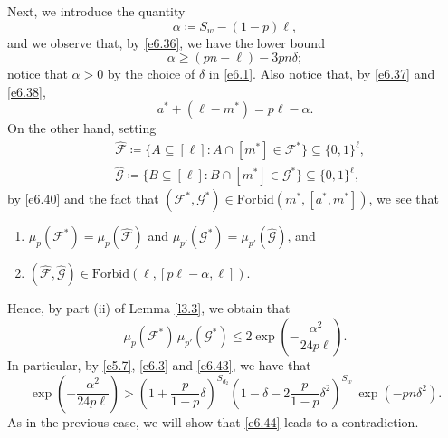 \documentclass[10pt]{amsart}
\theoremstyle{remark}
\newcommand{\meg}{\geqslant}
\newcommand{\mik}{\leqslant}
\newcommand{\Fcal}{\mathcal{F}}
\newcommand{\Gcal}{\mathcal{G}}
\begin{document}
Next, we introduce the quantity
\begin{equation} \label{e6.38}
\alpha\coloneqq S_w-(1-p)\ell,
\end{equation}
and we observe that, by \eqref{e6.36}, we have the lower bound
\begin{equation} \label{e6.39}
\alpha \meg \left(pn-\ell\right)-3pn\delta;
\end{equation}
notice that $\alpha>0$ by the choice of $\delta$ in \eqref{e6.1}.
Also notice that, by \eqref{e6.37} and \eqref{e6.38},
\begin{equation} \label{e6.40}
a^*+(\ell-m^*)=p\ell-\alpha.
\end{equation}
On the other hand, setting
\begin{align}
\label{e6.41} & \widehat{\Fcal}\coloneqq \{A\subseteq [\ell]:
A\cap [m^*]\in \Fcal^*\}\subseteq \{0,1\}^\ell, \\
\label{e6.42} & \widehat{\Gcal}\coloneqq \{B\subseteq [\ell]:
B\cap [m^*]\in \Gcal^*\}\subseteq \{0,1\}^\ell,
\end{align}
by \eqref{e6.40} and the fact that $(\Fcal^*,\Gcal^*)\in\mathrm{Forbid}(m^*,[a^*,m^*])$, we see that
\begin{enumerate}
\item[(i)] $\mu_p(\Fcal^*)=\mu_p(\widehat{\Fcal})$
and $\mu_{p'}(\Gcal^*)=\mu_{p'}(\widehat{\Gcal})$, and
\item[(ii)] $(\widehat{\Fcal},\widehat{\Gcal})\in \mathrm{Forbid}(\ell,[p\ell-\alpha,\ell])$.
\end{enumerate}
Hence, by part (ii) of Lemma \ref{l3.3}, we obtain that
\begin{equation} \label{e6.43}
\mu_p(\Fcal^*)\, \mu_{p'}(\Gcal^*)\mik 2\exp\left(-\frac{\alpha^2}{24p\ell}\right).
\end{equation}
In particular, by \eqref{e5.7}, \eqref{e6.3} and \eqref{e6.43}, we have that
\begin{equation} \label{e6.44}
\exp\left(-\frac{\alpha^2}{24p\ell}\right) > \left(1+\frac{p}{1-p}\delta\right)^{S_{d_2}}
\left(1-\delta-2\frac{p}{1-p}\delta^2\right)^{S_w}\, \exp(-pn\delta^2).
\end{equation}
As in the previous case, we will show that \eqref{e6.44} leads to a contradiction.
\end{document}
